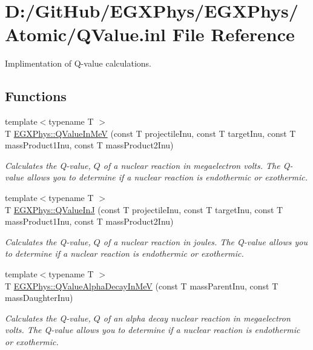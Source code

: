 \hypertarget{_q_value_8inl}{}\section{D\+:/\+Git\+Hub/\+E\+G\+X\+Phys/\+E\+G\+X\+Phys/\+Atomic/\+Q\+Value.inl File Reference}
\label{_q_value_8inl}


Implimentation of Q-\/value calculations.  


\subsection*{Functions}
\begin{DoxyCompactItemize}
\item 
{\footnotesize template$<$typename T $>$ }\\T \mbox{\hyperlink{group___e_g_x_phys-_q_value_ga53f07ac44d3d3b217b8c5b7aa548e3fc}{E\+G\+X\+Phys\+::\+Q\+Value\+In\+MeV}} (const T projectile\+Inu, const T target\+Inu, const T mass\+Product1\+Inu, const T mass\+Product2\+Inu)
\begin{DoxyCompactList}\small\item\em Calculates the Q-\/value, $Q$ of a nuclear reaction in megaelectron volts. The Q-\/value allows you to determine if a nuclear reaction is endothermic or exothermic. \end{DoxyCompactList}\item 
{\footnotesize template$<$typename T $>$ }\\T \mbox{\hyperlink{group___e_g_x_phys-_q_value_gaa61414574096631a36ff857b311c435c}{E\+G\+X\+Phys\+::\+Q\+Value\+InJ}} (const T projectile\+Inu, const T target\+Inu, const T mass\+Product1\+Inu, const T mass\+Product2\+Inu)
\begin{DoxyCompactList}\small\item\em Calculates the Q-\/value, $Q$ of a nuclear reaction in joules. The Q-\/value allows you to determine if a nuclear reaction is endothermic or exothermic. \end{DoxyCompactList}\item 
{\footnotesize template$<$typename T $>$ }\\T \mbox{\hyperlink{_q_value_8hpp_a4f9a38d3ad4bf93471a0affb493b6e72}{E\+G\+X\+Phys\+::\+Q\+Value\+Alpha\+Decay\+In\+MeV}} (const T mass\+Parent\+Inu, const T mass\+Daughter\+Inu)
\begin{DoxyCompactList}\small\item\em Calculates the Q-\/value, $Q$ of an alpha decay nuclear reaction in megaelectron volts. The Q-\/value allows you to determine if a nuclear reaction is endothermic or exothermic. \end{DoxyCompactList}\item 

\end{DoxyCompactItemize}
